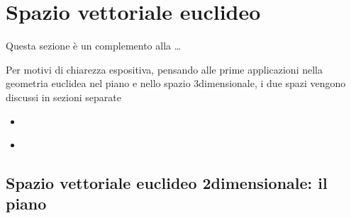 \documentclass[letterpaper,10pt,italian]{jupyterBook}
\begin{document}
\sphinxstepscope




\section{Spazio vettoriale euclideo}
\label{\detokenize{ch/algebra/vector-algebra-euclidean-space:spazio-vettoriale-euclideo}}\label{\detokenize{ch/algebra/vector-algebra-euclidean-space:math-hs-algebra-vector-euclidean-space}}\label{\detokenize{ch/algebra/vector-algebra-euclidean-space::doc}}
\sphinxAtStartPar
Questa sezione è un complemento alla {\hyperref[\detokenize{ch/algebra::doc}]{}}…



\sphinxAtStartPar
Per motivi di chiarezza espositiva, pensando alle prime applicazioni nella geometria euclidea nel piano e nello spazio 3\sphinxhyphen{}dimensionale, i due spazi vengono discussi in sezioni separate
\begin{itemize}
\item {} 
\sphinxAtStartPar
{\hyperref[\detokenize{ch/algebra/vector-algebra-euclidean-space-2d:math-hs-algebra-vector-euclidean-space-2d}]{}}

\item {} 
\sphinxAtStartPar
{\hyperref[\detokenize{ch/algebra/vector-algebra-euclidean-space-3d:math-hs-algebra-vector-euclidean-space-3d}]{}}

\end{itemize}

\sphinxstepscope


\subsection{Spazio vettoriale euclideo 2\sphinxhyphen{}dimensionale: il piano}
\label{\detokenize{ch/algebra/vector-algebra-euclidean-space-2d:spazio-vettoriale-euclideo-2-dimensionale-il-piano}}\label{\detokenize{ch/algebra/vector-algebra-euclidean-space-2d:math-hs-algebra-vector-euclidean-space-2d}}\label{\detokenize{ch/algebra/vector-algebra-euclidean-space-2d::doc}}
\end{document}
